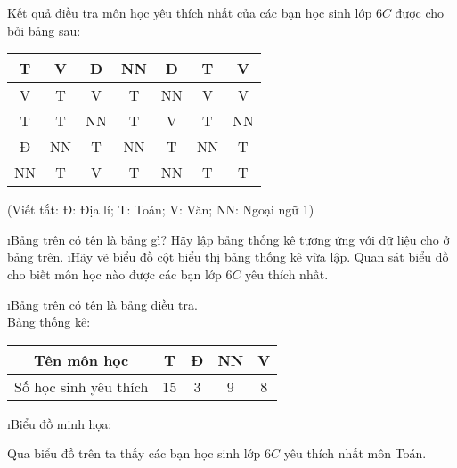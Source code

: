 \begin{bt}
	Kết quả điều tra môn học yêu thích nhất của các bạn học sinh lớp $6C$ được cho bởi bảng sau:
	\begin{center}
		\begin{tabular}{|c|c|c|c|c|c|c|}
			\hline
			T&	V&	Đ&	NN&	Đ&	T&	V\\
			\hline
			V&	T&	V&	T&	NN&	V&	V\\
			\hline
			T&	T&	NN&	T&	V&	T&	NN\\
			\hline
			Đ&	NN&	T&	NN&	T&	NN&	T\\
			\hline
			NN&	T&	V&	T&	NN&	T&	T\\
			\hline
		\end{tabular}
		
		\vspace*{5pt}
		(Viết tắt: Đ: Địa lí; T: Toán; V: Văn; NN: Ngoại ngữ 1)
	\end{center}
	\begin{enumerate}[a),leftmargin=*]
		\i Bảng trên có tên là bảng gì? Hãy lập bảng thống kê tương ứng với dữ liệu cho ở bảng trên.
		\i Hãy vẽ biểu đồ cột biểu thị bảng thống kê vừa lập. Quan sát biểu dồ cho biết môn học nào được các bạn lớp $6C$ yêu thích nhất.
	\end{enumerate}
	\begin{loigiaichuong40}
		\begin{enumerate}[a),leftmargin=*]
			\i	Bảng trên có tên là bảng điều tra.\\
			Bảng thống kê:
			\begin{center}
				\begin{tabular}{|c|c|c|c|c|}
					\hline
					Tên môn học&	T&	Đ&	NN&	V\\
					\hline
					Số học sinh yêu thích&	15&	3&	9&	8\\
					\hline
				\end{tabular}
			\end{center}
			\i	Biểu đồ minh họa:
			
			Qua biểu đồ trên ta thấy các bạn học sinh lớp $6C$ yêu thích nhất môn Toán.
		\end{enumerate}
	\end{loigiaichuong40}
\end{bt}

